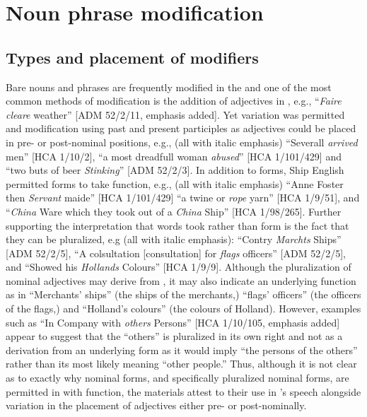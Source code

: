 \section{{Noun phrase modification} }\label{sec:5.5}

\subsection{{Types and placement of modifiers}}\label{sec:5.5.1}

Bare nouns and  phrases are frequently modified in the  and one of the most common methods of modification is the addition of adjectives in , e.g., “\textit{Faire cleare} weather” [ADM 52/2/11, emphasis added]. Yet variation was permitted and modification using past and present participles as adjectives could be placed in pre- or post-nominal positions, e.g., (all with italic emphasis) “Severall \textit{arrived} men” [HCA 1/10/2], “a most dreadfull woman \textit{abused}” [HCA 1/101/429] and “two buts of beer \textit{Stinking}” [ADM 52/2/3].  In addition to   forms, Ship English permitted  forms to take  function, e.g., (all with italic emphasis) “Anne Foster then \textit{Servant} maide” [HCA 1/101/429] “a twine or \textit{rope} yarn” [HCA 1/9/51], and “\textit{China} Ware which they took out of a \textit{China} Ship” [HCA 1/98/265]. Further supporting the interpretation that  words took  rather than  form is the fact that they can be pluralized, e.g (all with italic emphasis): “Contry \textit{Marchts} Ships” [ADM 52/2/5], “A colsultation [consultation] for \textit{flags} officers” [ADM 52/2/5], and “Showed his \textit{Hollands} Colours” [HCA 1/9/9]. Although the pluralization of nominal adjectives may derive from , it may also indicate an underlying  function as in “Merchants’ ships” (the ships of the merchants,) “flags’ officers” (the officers of the flags,) and “Holland’s colours” (the colours of Holland). However, examples such as “In Company with \textit{others} Persons” [HCA 1/10/105, emphasis added] appear to suggest that the  “others” is pluralized in its own right and not as a derivation from an underlying  form as it would imply “the persons of the others” rather than its most likely meaning “other people.” Thus, although it is not clear as to exactly why nominal forms, and specifically pluralized nominal forms, are permitted in  with  function, the  materials attest to their use in ’s speech alongside variation in the placement of  adjectives either pre- or post-nominally. 

